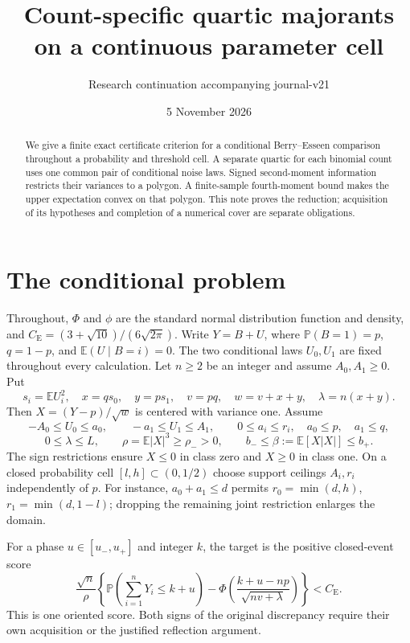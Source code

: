 \documentclass[11pt,a4paper]{article}
\title{Count-specific quartic majorants on a continuous parameter cell}
\author{Research continuation accompanying journal-v21}
\date{5 November 2026}
\newcommand{\E}{\mathbb E}
\newcommand{\Pp}{\mathbb P}
\newcommand{\CE}{C_{\mathrm E}}
\begin{document}
\maketitle
\begin{abstract}
We give a finite exact certificate criterion for a conditional Berry--Esseen
comparison throughout a probability and threshold cell. A separate quartic
for each binomial count uses one common pair of conditional noise laws.
Signed second-moment information restricts their variances to a polygon.
A finite-sample fourth-moment bound makes the upper expectation convex
on that polygon. This note proves the reduction; acquisition of its
hypotheses and completion of a numerical cover are separate obligations.
\end{abstract}

\section{The conditional problem}
Throughout, $\Phi$ and $\phi$ are the standard normal distribution
function and density, and $\CE=(3+\sqrt{10})/(6\sqrt{2\pi})$.
Write $Y=B+U$, where $\Pp(B=1)=p$, $q=1-p$, and
$\E(U\mid B=i)=0$. The two conditional laws $U_0,U_1$ are fixed
throughout every calculation. Let $n\ge2$ be an integer and assume
$A_0,A_1\ge0$. Put
\[
 s_i=\E U_i^2,\quad x=qs_0,\quad y=ps_1,\quad
 v=pq,\quad w=v+x+y,\quad \lambda=n(x+y).
\]
Then $X=(Y-p)/\sqrt w$ is centered with variance one. Assume
\[
 -A_0\le U_0\le a_0,\qquad -a_1\le U_1\le A_1,\qquad
 0\le a_i\le r_i,\quad a_0\le p,\quad a_1\le q,
\]
\[
 0\le\lambda\le L,\qquad \rho=\E|X|^3\ge\rho_->0,\qquad
 b_-\le\beta:=\E[X|X|]\le b_+.
\]
The sign restrictions ensure $X\le0$ in class zero and $X\ge0$ in
class one. On a closed probability cell $[l,h]\subset(0,1/2)$ choose
support ceilings $A_i,r_i$ independently of $p$. For instance,
$a_0+a_1\le d$ permits $r_0=\min(d,h)$,
$r_1=\min(d,1-l)$; dropping the remaining joint restriction enlarges
the domain.

For a phase $u\in[u_-,u_+]$ and integer $k$, the target is the
positive closed-event score
\[
 \frac{\sqrt n}{\rho}
 \left\{\Pp\left(\sum_{i=1}^nY_i\le k+u\right)
 -\Phi\left(\frac{k+u-np}{\sqrt{nv+\lambda}}\right)\right\}<\CE.
 \tag{1}
\]
This is one oriented score. Both signs of the original discrepancy
require their own acquisition or the justified reflection argument.
\end{document}
